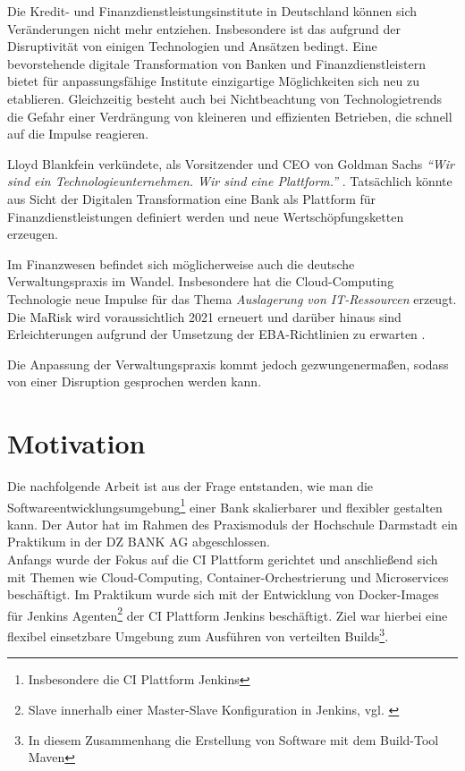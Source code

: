 Die Kredit- und Finanzdienstleistungsinstitute in Deutschland können sich Veränderungen nicht mehr entziehen. Insbesondere ist das aufgrund der Disruptivität von einigen Technologien und Ansätzen bedingt. Eine bevorstehende digitale Transformation von Banken und Finanzdienstleistern bietet für anpassungsfähige Institute einzigartige Möglichkeiten sich neu zu etablieren. Gleichzeitig besteht auch bei Nichtbeachtung von Technologietrends die Gefahr einer Verdrängung von kleineren und effizienten Betrieben, die schnell auf die Impulse reagieren.

Lloyd Blankfein verkündete, als Vorsitzender und \ac{CEO} von Goldman Sachs \emph{\enquote{Wir sind ein Technologieunternehmen. Wir sind eine Plattform.}} \cite{Gupta:2017}. Tatsächlich könnte aus Sicht der Digitalen Transformation eine Bank als Plattform für Finanzdienstleistungen definiert werden und neue Wertschöpfungsketten erzeugen. 

Im Finanzwesen befindet sich möglicherweise auch die deutsche Verwaltungspraxis im Wandel. Insbesondere hat die Cloud-Computing Technologie neue Impulse für das Thema \emph{Auslagerung von IT-Ressourcen\cite{MaRisk:2017, BAIT:2018}} erzeugt. Die MaRisk wird voraussichtlich 2021 erneuert und darüber hinaus sind Erleichterungen aufgrund der Umsetzung der EBA-Richtlinien zu erwarten \cite{BaFin:marisk-novelle}.

Die Anpassung der Verwaltungspraxis kommt jedoch gezwungenermaßen, sodass von einer Disruption gesprochen werden kann.
%
%
\section{Motivation}
\label{sec:intro:motivation}

Die nachfolgende Arbeit ist aus der Frage entstanden, wie man die Softwareentwicklungsumgebung\footnote{Insbesondere die CI Plattform Jenkins} einer Bank skalierbarer und flexibler gestalten kann. Der Autor hat im Rahmen des Praxismoduls der Hochschule Darmstadt ein Praktikum in der DZ BANK AG abgeschlossen.
\medskip
\\
Anfangs wurde der Fokus auf die \ac{CI} Plattform gerichtet und anschließend sich mit Themen wie Cloud-Computing, Container-Orchestrierung und Microservices beschäftigt. Im Praktikum wurde sich mit der Entwicklung von Docker-Images für Jenkins Agenten\footnote{Slave innerhalb einer Master-Slave Konfiguration in Jenkins, vgl. \cite{Pathania2017}} der \ac{CI} Plattform Jenkins beschäftigt. Ziel war hierbei eine flexibel einsetzbare Umgebung zum Ausführen von verteilten Builds\footnote{In diesem Zusammenhang die Erstellung von Software mit dem Build-Tool Maven}.

